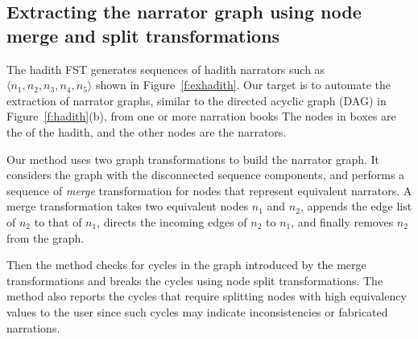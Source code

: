 \documentclass{llncs}
\begin{document}
%
%
%
\subsection{Extracting the narrator graph using node merge and split transformations}
\label{sec:graph}


The hadith FST generates sequences of hadith narrators
such as $\langle n_1,n_2,n_3,n_4,n_5 \rangle$ shown in 
Figure~\ref{f:exhadith}. 
Our target is to automate the extraction of 
narrator graphs,
similar to the directed acyclic graph (DAG) 
in Figure~\ref{f:hadith}(b),
from one or more narration books
The nodes in boxes are the  of the hadith, 
and the other nodes are the narrators.

Our method uses two graph transformations to build the narrator
graph. 
It considers the graph with the disconnected sequence components, 
and performs a sequence of {\em merge} transformation 
for nodes that
represent equivalent narrators. 
A merge transformation takes two equivalent nodes $n_1$ and $n_2$,
appends the edge list of $n_2$ to that of $n_1$,
directs the incoming edges of $n_2$ to $n_1$,
and finally removes $n_2$ from the graph.
   
Then the method checks for cycles in the graph
introduced by the merge transformations and breaks the cycles
using node split transformations. 
The method also reports the cycles that require splitting nodes 
with high equivalency values to the user since such cycles may
indicate inconsistencies or fabricated narrations.
\end{document}

